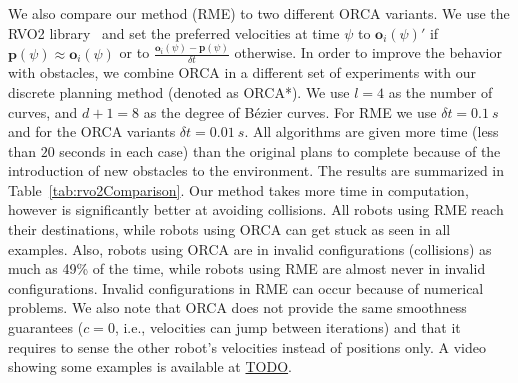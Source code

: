 \documentclass{svproc}
\newcommand{\vp}{\mathbf{p}}
\newcommand{\vo}{\mathbf{o}}
\begin{document}
We also compare our method (RME) to two different ORCA variants.
We use the RVO2 library~\cite{orca} and set the preferred velocities at time $\psi$ to $\vo_i(\psi)'$ if $\vp(\psi)\approx \vo_i(\psi)$ or to $\frac{\vo_i(\psi) - \vp(\psi)}{\delta t}$ otherwise.
In order to improve the behavior with obstacles, we combine ORCA in a different set of experiments with our discrete planning method (denoted as ORCA*).
We use $l=4$ as the number of curves, and $d+1=8$ as the degree of B\'ezier curves.
For RME we use $\delta t = \SI{0.1}{s}$ and for the ORCA variants $\delta t = \SI{0.01}{s}$.
All algorithms are given more time (less than $20$ seconds in each case) than the original plans to complete because of the introduction of new obstacles to the environment.
The results are summarized in Table~\ref{tab:rvo2Comparison}.
Our method takes more time in computation, however is significantly better at avoiding collisions.
All robots using RME reach their destinations, while robots using ORCA can get stuck as seen in all examples.
Also, robots using ORCA are in invalid configurations (collisions) as much as 49\% of the time, while robots using RME are almost never in invalid configurations.
Invalid configurations in RME can occur because of numerical problems.
We also note that ORCA does not provide the same smoothness guarantees ($c=0$, i.e., velocities can jump between iterations) and that it requires to sense the other robot's velocities instead of positions only.
A video showing some examples is available at \url{TODO}.
\end{document}
